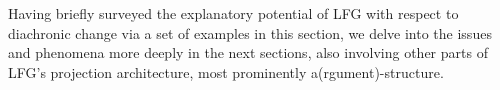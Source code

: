 \documentclass[output=paper,hidelinks]{langscibook}
\begin{document}
Having briefly surveyed the explanatory potential of LFG with respect to diachronic change via a set of examples in this section, we delve into the issues and phenomena more deeply in the next sections, also  involving other parts of LFG's projection architecture, most prominently a(rgument)-structure.



\end{document}
